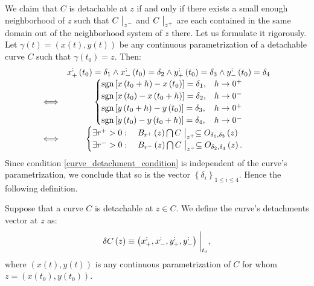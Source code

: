 \documentclass[11pt]{book}
\begin{document}
We claim that $C$ is detachable at $z$ if and only if there exists
a small enough neighborhood of $z$ such that $C\bigm\lvert_{z^{-}}$
and $C\bigm\lvert_{z^{+}}$ are each contained in the same domain
out of the neighborhood system of $z$ there. Let us formulate it
rigorously. Let $\gamma\left(t\right)=\left(x\left(t\right),y\left(t\right)\right)$
be any continuous parametrization of a detachable curve $C$ such
that $\gamma\left(t_{0}\right)=z$. Then:
\[
\label{curve_detachment_condition}\begin{array}{cc}
 & x_{+}^{;}\left(t_{0}\right)=\delta_{1}\land x_{-}^{;}\left(t_{0}\right)=\delta_{2}\land y_{+}^{;}\left(t_{0}\right)=\delta_{3}\land y_{-}^{;}\left(t_{0}\right)=\delta_{4}\\
\Longleftrightarrow & \begin{cases}
\text{sgn}\left[x\left(t_{0}+h\right)-x\left(t_{0}\right)\right]=\delta_{1}, & h\rightarrow0^{+}\\
\text{sgn}\left[x\left(t_{0}\right)-x\left(t_{0}+h\right)\right]=\delta_{2}, & h\rightarrow0^{-}\\
\text{sgn}\left[y\left(t_{0}+h\right)-y\left(t_{0}\right)\right]=\delta_{3}, & h\rightarrow0^{+}\\
\text{sgn}\left[y\left(t_{0}\right)-y\left(t_{0}+h\right)\right]=\delta_{4}, & h\rightarrow0^{-}
\end{cases}\\
\Longleftrightarrow & \begin{cases}
\exists r^{+}>0:\quad B_{r^{+}}\left(z\right)\bigcap C\bigm\lvert_{z^{+}}\subseteq O_{\delta_{1},\delta_{3}}\left(z\right)\\
\exists r^{-}>0:\quad B_{r^{-}}\left(z\right)\bigcap C\bigm\lvert_{z^{-}}\subseteq O_{\delta_{2},\delta_{4}}\left(z\right).
\end{cases}
\end{array}
\]
Since condition \ref{curve_detachment_condition} is independent of the curve's parametrization,
we conclude that so is the vector $\left\{ \delta_{i}\right\} _{1\leq i\leq4}$.
Hence the following definition.

\begin{definition}
Suppose that a curve $C$ is detachable at $z\in C$. We define the
curve's detachments vector at $z$ as:
\[
\delta C\left(z\right)\equiv\left(x_{+}^{;},x_{-}^{;},y_{+}^{;},y_{-}^{;}\right)\biggm\lvert_{t_{0}},
\]
where $\left(x\left(t\right),y\left(t\right)\right)$ is any continuous
parametrization of $C$ for whom $z=\left(x\left(t_{0}\right),y\left(t_{0}\right)\right)$.
\end{definition}
\end{document}
